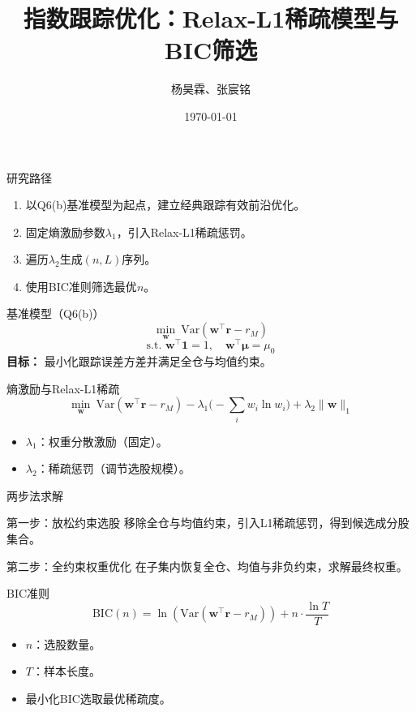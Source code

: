 \documentclass[UTF8]{ctexbeamer}
\title{指数跟踪优化：Relax-L1稀疏模型与BIC筛选}
\author{杨昊霖、张宸铭}
\date{\today}
\begin{document}
\begin{frame}
  \titlepage
\end{frame}

\begin{frame}{研究路径}
  \begin{enumerate}
    \item 以Q6(b)基准模型为起点，建立经典跟踪有效前沿优化。
    \item 固定熵激励参数$\lambda_1$，引入Relax-L1稀疏惩罚。
    \item 遍历$\lambda_2$生成$(n,L)$序列。
    \item 使用BIC准则筛选最优$n$。
  \end{enumerate}
\end{frame}

\begin{frame}{基准模型（Q6(b)）}
  \[
  \min_{\boldsymbol{w}} \ \mathrm{Var}(\boldsymbol{w}^\top \boldsymbol{r} - r_M)
  \]
  \[
  \text{s.t. } \boldsymbol{w}^\top \boldsymbol{1} = 1,\quad \boldsymbol{w}^\top \boldsymbol{\mu} = \mu_0
  \]
  \vspace{0.3cm}
  \textbf{目标：} 最小化跟踪误差方差并满足全仓与均值约束。
\end{frame}

\begin{frame}{熵激励与Relax-L1稀疏}
  \[
  \min_{\boldsymbol{w}} \ \mathrm{Var}(\boldsymbol{w}^\top \boldsymbol{r} - r_M)
  - \lambda_1 \Big(-\sum_i w_i\ln w_i\Big) + \lambda_2 \|\boldsymbol{w}\|_1
  \]
  \begin{itemize}
    \item $\lambda_1$：权重分散激励（固定）。
    \item $\lambda_2$：稀疏惩罚（调节选股规模）。
  \end{itemize}
\end{frame}

\begin{frame}{两步法求解}
  \begin{block}{第一步：放松约束选股}
  移除全仓与均值约束，引入L1稀疏惩罚，得到候选成分股集合。
  \end{block}
  \begin{block}{第二步：全约束权重优化}
  在子集内恢复全仓、均值与非负约束，求解最终权重。
  \end{block}
\end{frame}

\begin{frame}{BIC准则}
  \[
  \mathrm{BIC}(n) = \ln(\mathrm{Var}(\boldsymbol{w}^\top \boldsymbol{r} - r_M)) + n\cdot \frac{\ln T}{T}
  \]
  \begin{itemize}
    \item $n$：选股数量。
    \item $T$：样本长度。
    \item 最小化BIC选取最优稀疏度。
  \end{itemize}
\end{frame}
\end{document}
